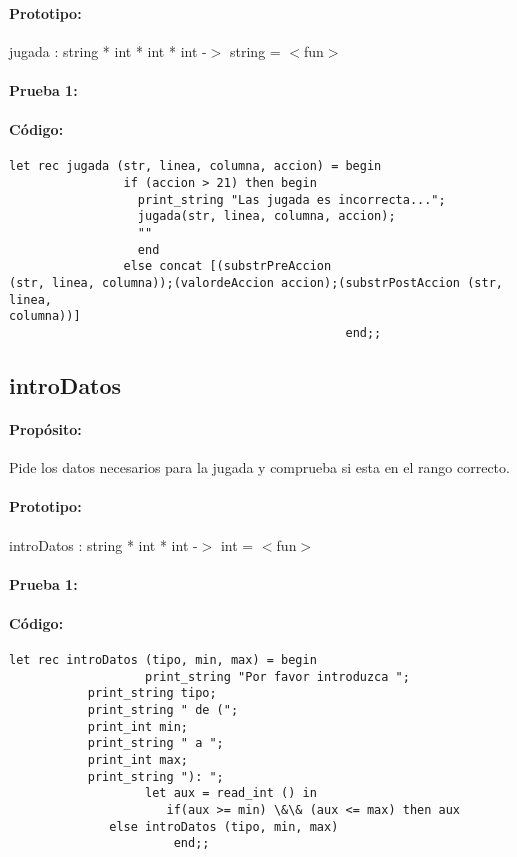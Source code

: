 \paragraph{Prototipo:} jugada : string * int * int * int -$>$ string = $<$fun$>$
\paragraph{Prueba 1:}
\paragraph{Código:}
\begin{verbatim}
let rec jugada (str, linea, columna, accion) = begin
                if (accion > 21) then begin 
                  print_string "Las jugada es incorrecta..."; 
                  jugada(str, linea, columna, accion);
                  ""
                  end
                else concat [(substrPreAccion
(str, linea, columna));(valordeAccion accion);(substrPostAccion (str, linea,
columna))]
                                               end;;
\end{verbatim}

\subsection{introDatos}

\paragraph{Propósito:} Pide los datos necesarios para la jugada y comprueba si esta en el
rango correcto.
\paragraph{Prototipo:} introDatos : string * int * int -$>$ int = $<$fun$>$
\paragraph{Prueba 1:}
\paragraph{Código:}
\begin{verbatim}
let rec introDatos (tipo, min, max) = begin
                   print_string "Por favor introduzca ";
		   print_string tipo;
		   print_string " de (";
		   print_int min;
		   print_string " a ";
		   print_int max;
		   print_string "): ";
                   let aux = read_int () in
                      if(aux >= min) \&\& (aux <= max) then aux
		      else introDatos (tipo, min, max)
				       end;;
\end{verbatim}

